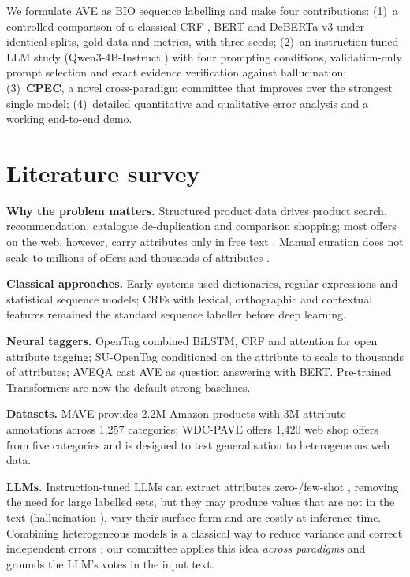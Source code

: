 \documentclass[10pt,twocolumn,a4paper]{article}
\begin{document}
We formulate AVE as BIO sequence labelling \cite{ramshaw1995} and make four contributions: (1)~a controlled comparison of a classical CRF \cite{lafferty2001}, BERT \cite{devlin2019} and DeBERTa-v3 \cite{he2023debertav3} under identical splits, gold data and metrics, with three seeds; (2)~an instruction-tuned LLM study (Qwen3-4B-Instruct \cite{qwen3}) with four prompting conditions, validation-only prompt selection and exact evidence verification against hallucination; (3)~\textbf{CPEC}, a novel cross-paradigm committee that improves over the strongest single model; (4)~detailed quantitative and qualitative error analysis and a working end-to-end demo.

\section{Literature survey}
\textbf{Why the problem matters.} Structured product data drives product search, recommendation, catalogue de-duplication and comparison shopping; most offers on the web, however, carry attributes only in free text \cite{zheng2018opentag,yang2022mave}. Manual curation does not scale to millions of offers and thousands of attributes \cite{xu2019scaling}.

\textbf{Classical approaches.} Early systems used dictionaries, regular expressions and statistical sequence models; CRFs \cite{lafferty2001} with lexical, orthographic and contextual features remained the standard sequence labeller before deep learning.

\textbf{Neural taggers.} OpenTag \cite{zheng2018opentag} combined BiLSTM, CRF and attention for open attribute tagging; SU-OpenTag \cite{xu2019scaling} conditioned on the attribute to scale to thousands of attributes; AVEQA \cite{wang2020aveqa} cast AVE as question answering with BERT. Pre-trained Transformers \cite{devlin2019,he2021deberta,he2023debertav3} are now the default strong baselines.

\textbf{Datasets.} MAVE \cite{yang2022mave} provides 2.2M Amazon products with 3M attribute annotations across 1,257 categories; WDC-PAVE \cite{brinkmann2024wdcpave} offers 1,420 web shop offers from five categories and is designed to test generalisation to heterogeneous web data.

\textbf{LLMs.} Instruction-tuned LLMs can extract attributes zero-/few-shot \cite{brown2020,brinkmann2024extractgpt}, removing the need for large labelled sets, but they may produce values that are not in the text (hallucination \cite{ji2023hallucination}), vary their surface form and are costly at inference time. Combining heterogeneous models is a classical way to reduce variance and correct independent errors \cite{dietterich2000}; our committee applies this idea \emph{across paradigms} and grounds the LLM's votes in the input text.
\end{document}
